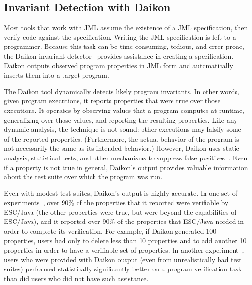 \documentclass{entcs}
\begin{document}
\subsection{Invariant Detection with Daikon}
\label{daikon}

Most tools that work with JML assume the existence of a JML
specification, then verify code against the specification.  Writing
the JML specification is left to a programmer.  Because this task can
be time-consuming, tedious, and error-prone, the Daikon invariant
detector~\cite{ErnstCGN2001:TSE} provides
assistance in creating a specification.  Daikon outputs observed
program properties in JML form and automatically inserts them into a
target program.

The Daikon tool dynamically detects likely program invariants.  In
other words, given program executions, it reports
properties that were true over those executions.  It operates by
observing values that a program computes at runtime, generalizing over
those values, and reporting the resulting properties.  Like any
dynamic analysis, the technique is not sound: other executions may
falsify some of the reported properties.  (Furthermore, the actual
behavior of the program is not necessarily the same as its intended
behavior.)  However, Daikon uses static analysis, statistical tests,
and other mechanisms to suppress false positives~\cite{ErnstCGN2000:Relevance}.
Even if a property
is not true in general, Daikon's output provides valuable information
about the test suite over which the program was run.

Even with modest test suites, Daikon's output is highly accurate.  In
one set of experiments~\cite{NimmerE02:ISSTA}, over 90\% of the
properties that it reported were verifiable by ESC/Java (the other
properties were true, but were beyond the capabilities of ESC/Java),
and it reported over 90\% of the properties that ESC/Java needed in
order to complete its verification.  For example, if Daikon generated
100 properties, users had only to delete less than 10 properties and
to add another 10 properties in order to have a verifiable set of
properties.  In another experiment~\cite{NimmerE02:FSE}, users who
were provided with Daikon output (even from unrealistically bad test
suites) performed statistically significantly better on a program
verification task than did users who did not have such assistance.
\end{document}
